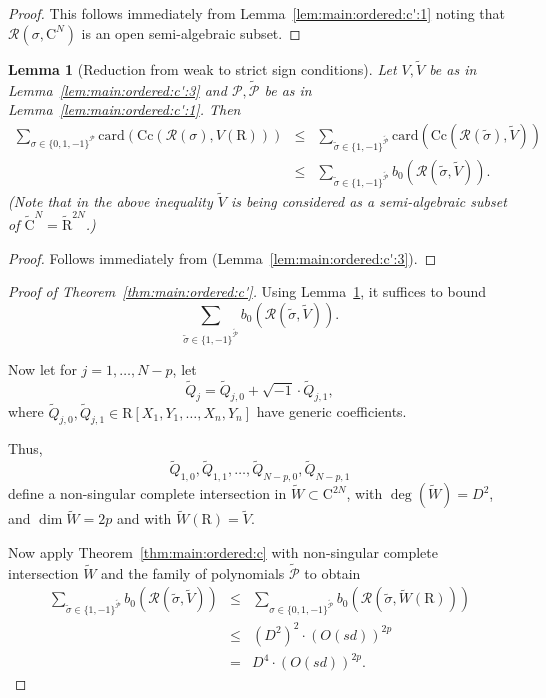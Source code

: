 \documentclass[10pt]{amsart}
\newtheorem{lemma}{Lemma}[section]
\theoremstyle{definition}
\theoremstyle{remark}
\numberwithin{equation}{section}
\newcommand {\R} {\mathrm{R}}
\newcommand {\C}     {\mathrm{C}}
\newcommand {\RR} {{\mathcal R}}
\newcommand{\card}{\mathrm{card}}
\newcommand{\Cc}{\mathrm{Cc}}
\begin{document}
\begin{proof}
This follows immediately from  Lemma~\ref{lem:main:ordered:c':1} noting that $\RR(\sigma,\C^N)$ is an open semi-algebraic subset.  
\end{proof}

\begin{lemma}[Reduction from weak to strict sign conditions]
\label{lem:main:ordered:c':4}
Let $V,\widetilde{V}$ be as in Lemma~\ref{lem:main:ordered:c':3} and
$\mathcal{P},\widetilde{\mathcal{P}}$ be as in Lemma~\ref{lem:main:ordered:c':1}.
Then
\begin{align*}
\sum_{\sigma \in \{0,1,-1\}^{\mathcal{P}}} \card(\Cc(\RR(\sigma),V(\R)))&\leq& 
\sum_{\widetilde{\sigma} \in \{1,-1\}^{\widetilde{\mathcal{P}}}} 
\card(\Cc(\RR(\widetilde{\sigma}),\widetilde{V})) \\
&\leq&
\sum_{\widetilde{\sigma} \in \{1,-1\}^{\widetilde{\mathcal{P}}}} 
b_0(\RR(\widetilde{\sigma},\widetilde{V})).
\end{align*}
(Note that in the above inequality $\widetilde{V}$ is being considered as a semi-algebraic subset of $\widetilde{\C}^N = \widetilde{\R}^{2 N}$.)
\end{lemma}



\begin{proof}
    Follows immediately from (Lemma~\ref{lem:main:ordered:c':3}).
\end{proof}


\begin{proof}[Proof of Theorem~\ref{thm:main:ordered:c'}]
 Using Lemma~\ref{lem:main:ordered:c':4}, it suffices to bound   
\[
\sum_{\widetilde{\sigma} \in \{1,-1\}^{\widetilde{\mathcal{P}}}} 
b_0(\RR(\widetilde{\sigma},\widetilde{V})).
\]

Now let for $j=1,\ldots,N-p$, let 
\[
\widetilde{Q}_j = \widetilde{Q}_{j,0} + \sqrt{-1}\cdot \widetilde{Q}_{j,1},
\]
where $\widetilde{Q}_{j,0}, \widetilde{Q}_{j,1} \in \R[X_1,Y_1,\ldots,X_n,Y_n]$ have generic coefficients.

Thus, 
\[
\widetilde{Q}_{1,0},\widetilde{Q}_{1,1},\ldots,
\widetilde{Q}_{N-p,0},\widetilde{Q}_{N-p,1}
\]
define a non-singular complete intersection in $\widetilde{W} \subset \C^{2N}$, with $\deg(\widetilde{W}) = D^2$, and $\dim \widetilde{W} = 2p$
and with $\widetilde{W}(\R) = \widetilde{V}$.

Now apply Theorem~\ref{thm:main:ordered:c} with non-singular complete intersection $\widetilde{W}$ and the family of polynomials
$\widetilde{\mathcal{P}}$ to obtain
\begin{eqnarray*}
\sum_{\widetilde{\sigma} \in \{1,-1\}^{\widetilde{\mathcal{P}}}} 
b_0(\RR(\widetilde{\sigma},\widetilde{V}))
&\leq&
\sum_{\sigma \in \{0,1,-1\}^{\widetilde{\mathcal{P}}}} 
b_0(\RR(\widetilde{\sigma},\widetilde{W}(\R))) \\
&\leq&
(D^2)^2 \cdot (O(s d))^{2 p} \\
&=&
D^4 \cdot (O(s d))^{2 p}.
\end{eqnarray*}
\end{proof}
\end{document}
